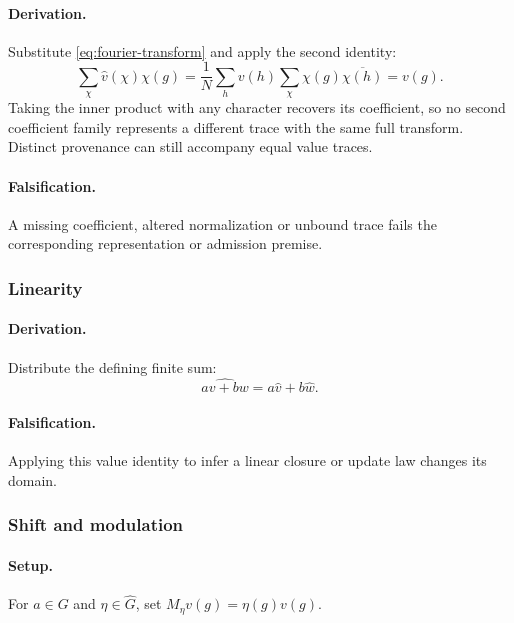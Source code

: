 \paragraph{Derivation.}
Substitute \eqref{eq:fourier-transform} and apply the second identity:
\begin{equation}
\sum_{\chi}\widehat v(\chi)\chi(g)
=\frac1N\sum_h v(h)\sum_\chi\chi(g)\overline{\chi(h)}
=v(g).
\label{eq:fourier-inversion}
\end{equation}
Taking the inner product with any character recovers its coefficient, so
no second coefficient family represents a different trace with the same
full transform. Distinct provenance can still accompany equal value traces.
\paragraph{Falsification.} A missing coefficient, altered normalization or
unbound trace fails the corresponding representation or admission premise.


\subsubsection{Linearity}
\paragraph{Derivation.}
Distribute the defining finite sum:
\begin{equation}
\widehat{av+bw}=a\widehat v+b\widehat w.
\label{eq:fourier-linearity}
\end{equation}
\paragraph{Falsification.} Applying this value identity to infer a linear
closure or update law changes its domain.


\subsubsection{Shift and modulation}
\paragraph{Setup.}
For \(a\in G\) and \(\eta\in\widehat G\), set \(M_\eta v(g)=\eta(g)v(g)\).
